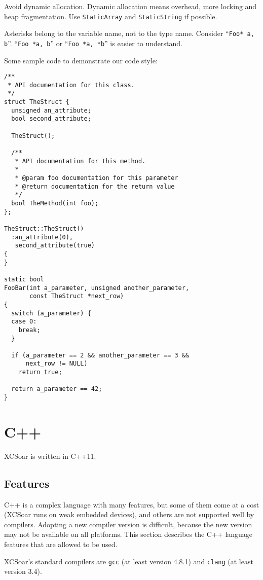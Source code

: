 \documentclass[a4paper,12pt]{refrep}
\begin{document}
Avoid dynamic allocation.  Dynamic allocation means overhead, more
locking and heap fragmentation.  Use \texttt{StaticArray} and
\texttt{StaticString} if possible.

Asterisks belong to the variable name, not to the type name.  Consider
``\texttt{Foo* a, b}''.  ``\texttt{Foo *a, b}'' or ``\texttt{Foo *a,
  *b}'' is easier to understand.

Some sample code to demonstrate our code style:

\begin{verbatim}
/**
 * API documentation for this class.
 */
struct TheStruct {
  unsigned an_attribute;
  bool second_attribute;

  TheStruct();

  /**
   * API documentation for this method.
   *
   * @param foo documentation for this parameter
   * @return documentation for the return value
   */
  bool TheMethod(int foo);
};

TheStruct::TheStruct()
  :an_attribute(0),
   second_attribute(true)
{
}

static bool
FooBar(int a_parameter, unsigned another_parameter,
       const TheStruct *next_row)
{
  switch (a_parameter) {
  case 0:
    break;
  }

  if (a_parameter == 2 && another_parameter == 3 &&
      next_row != NULL)
    return true;

  return a_parameter == 42;
}
\end{verbatim}

\section{C++}

XCSoar is written in C++11.

\subsection{Features}

C++ is a complex language with many features, but some of them come at
a cost (XCSoar runs on weak embedded devices), and others are not
supported well by compilers.  Adopting a new compiler version is
difficult, because the new version may not be available on all
platforms.  This section describes the C++ language features that are
allowed to be used.

XCSoar's standard compilers are \texttt{gcc} (at least version 4.8.1) and
\texttt{clang} (at least version 3.4).
\end{document}
